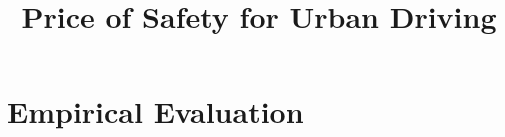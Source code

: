 \documentclass[letterpaper]{article}
\title{Price of Safety for Urban Driving}
\begin{document}
\maketitle

\begin{abstract}
    
\end{abstract}

\section{Empirical Evaluation}



\end{document}
